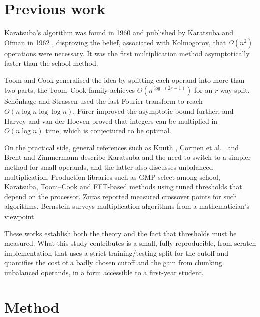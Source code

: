 \documentclass[11pt,a4paper]{article}
\begin{document}
\section{Previous work}
\label{sec:related}

Karatsuba's algorithm was found in 1960 and published by Karatsuba and Ofman in 1962 \cite{karatsuba1962}, disproving the belief, associated with Kolmogorov, that $\Omega(n^2)$ operations were necessary. It was the first multiplication method asymptotically faster than the school method.

Toom \cite{toom1963} and Cook \cite{cook1966} generalised the idea by splitting each operand into more than two parts; the Toom--Cook family achieves $\Theta(n^{\log_{r}(2r-1)})$ for an $r$-way split. Sch\"onhage and Strassen \cite{schonhage1971} used the fast Fourier transform to reach $O(n\log n\log\log n)$. F\"urer \cite{furer2007} improved the asymptotic bound further, and Harvey and van der Hoeven \cite{harvey2021} proved that integers can be multiplied in $O(n\log n)$ time, which is conjectured to be optimal.

On the practical side, general references such as Knuth \cite{knuth1997}, Cormen et al.\ \cite{clrs2009} and Brent and Zimmermann \cite{brent2010} describe Karatsuba and the need to switch to a simpler method for small operands, and the latter also discusses unbalanced multiplication. Production libraries such as GMP \cite{gmp} select among school, Karatsuba, Toom--Cook and FFT-based methods using tuned thresholds that depend on the processor. Zuras \cite{zuras1994} reported measured crossover points for such algorithms. Bernstein \cite{bernstein2008} surveys multiplication algorithms from a mathematician's viewpoint.

These works establish both the theory and the fact that thresholds must be measured. What this study contributes is a small, fully reproducible, from-scratch implementation that uses a strict training/testing split for the cutoff and quantifies the cost of a badly chosen cutoff and the gain from chunking unbalanced operands, in a form accessible to a first-year student.

\section{Method}
\label{sec:method}
\end{document}
